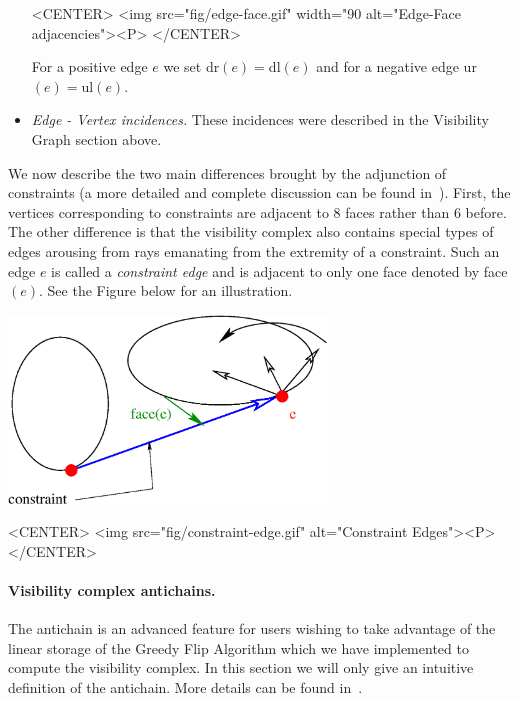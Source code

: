 \begin{itemize}
    \begin{ccHtmlOnly}
	<CENTER>
	    <img src="fig/edge-face.gif" width="90%
	     alt="Edge-Face adjacencies"><P>
	</CENTER>
    \end{ccHtmlOnly}
    For a positive edge $e$ we set dr$(e) = $dl$(e)$ and for a negative edge
    ur$(e) = $ul$(e)$.
    \item \emph{Edge - Vertex incidences. } These incidences were described in
    the Visibility Graph section above.
\end{itemize}

We now describe the two main differences brought by the adjunction of
constraints (a more detailed and complete discussion can be found
in~\cite{G-ap-sstvc-01}).  First, the vertices corresponding to constraints are
adjacent to $8$ faces rather than $6$ before. The other difference is that the
visibility complex also contains special types of edges arousing from rays
emanating from the extremity of a constraint. Such an edge $e$ is called a
\emph{constraint edge} and is adjacent to only one face denoted by face$(e)$.
See the Figure below for an illustration.
\begin{ccTexOnly}
    \begin{center}
	\includegraphics[height=5cm]{fig/constraint-edge.eps}%
    \end{center}
\end{ccTexOnly}

\begin{ccHtmlOnly}
    <CENTER>
	<img src="fig/constraint-edge.gif" alt="Constraint Edges"><P>
    </CENTER>
\end{ccHtmlOnly}

\paragraph{Visibility complex antichains. } The antichain is an advanced feature
for users wishing to take advantage of the linear storage of the Greedy Flip
Algorithm which we have implemented to compute the visibility complex. In this
section we will only give an intuitive definition of the antichain. More details
can be found in~\cite{pv-tsvcpt-96}. 

